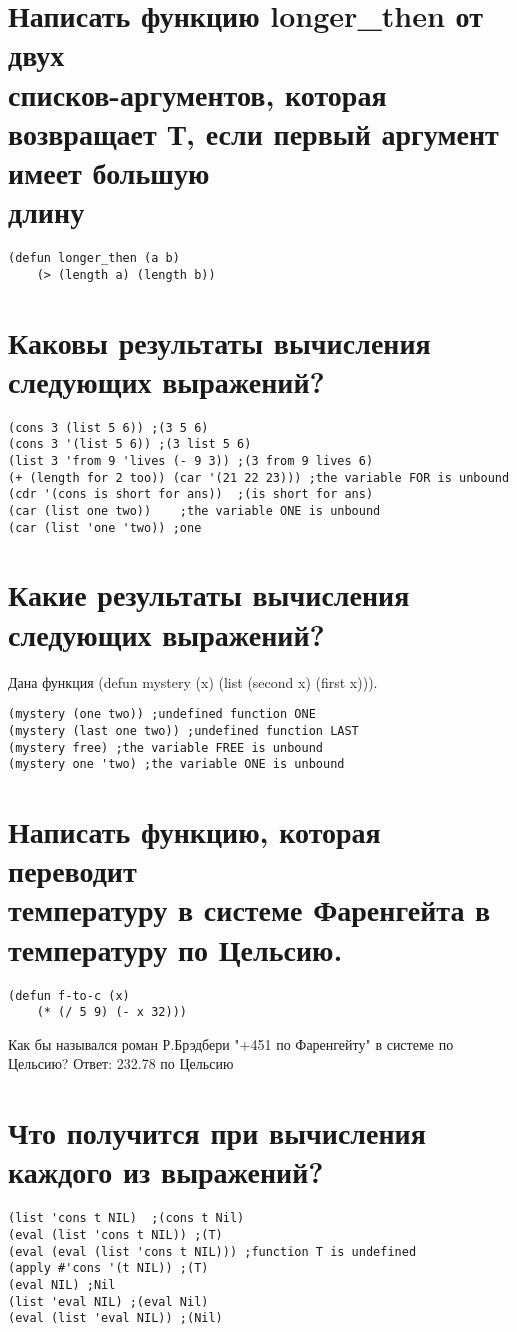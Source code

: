 \documentclass[a4paper, 14pt, unknownkeysallowed]{extreport}
\begin{document}
\section{Написать функцию longer\_then от двух\\ списков-аргументов, которая возвращает Т, если первый аргумент имеет большую\\ длину}

\begin{lstlisting}
(defun longer_then (a b)
	(> (length a) (length b))
\end{lstlisting}

\section{Каковы результаты вычисления следующих выражений?}

\begin{lstlisting}
(cons 3 (list 5 6))	;(3 5 6)
(cons 3 '(list 5 6)) ;(3 list 5 6)
(list 3 'from 9 'lives (- 9 3))	;(3 from 9 lives 6)
(+ (length for 2 too)) (car '(21 22 23))) ;the variable FOR is unbound
(cdr '(cons is short for ans))	;(is short for ans)
(car (list one two))	;the variable ONE is unbound
(car (list 'one 'two)) ;one
\end{lstlisting}

\section{Какие результаты вычисления следующих выражений?}
Дана функция (defun mystery (x) (list (second x) (first x))).

\begin{lstlisting}
(mystery (one two)) ;undefined function ONE
(mystery (last one two)) ;undefined function LAST
(mystery free) ;the variable FREE is unbound
(mystery one 'two) ;the variable ONE is unbound
\end{lstlisting} 

\section{Написать функцию, которая переводит \\температуру в системе Фаренгейта в \\температуру по Цельсию.}

\begin{lstlisting}
(defun f-to-c (x) 
	(* (/ 5 9) (- x 32)))
\end{lstlisting} 

Как бы назывался роман Р.Брэдбери "+451 по Фаренгейту" в системе по Цельсию?
Ответ: 232.78 по Цельсию

\section{Что получится при вычисления каждого из выражений?}

\begin{lstlisting}
(list 'cons t NIL)	;(cons t Nil)
(eval (list 'cons t NIL)) ;(T)
(eval (eval (list 'cons t NIL))) ;function T is undefined
(apply #'cons '(t NIL))	;(T)
(eval NIL) ;Nil
(list 'eval NIL) ;(eval Nil)	
(eval (list 'eval NIL)) ;(Nil)
\end{lstlisting} 
\end{document}

